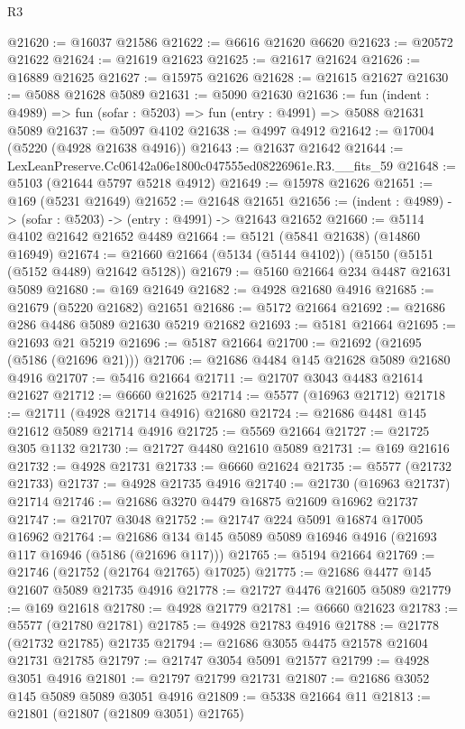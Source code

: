 \begin{lexlean}{R3}
\begin{coremodule}
@21620 := @16037 @21586
@21622 := @6616 @21620 @6620
@21623 := @20572 @21622
@21624 := @21619 @21623
@21625 := @21617 @21624
@21626 := @16889 @21625
@21627 := @15975 @21626
@21628 := @21615 @21627
@21630 := @5088 @21628 @5089
@21631 := @5090 @21630
@21636 := fun (indent : @4989) => fun (sofar : @5203) => fun (entry : @4991) => @5088 @21631 @5089
@21637 := @5097 @4102
@21638 := @4997 @4912
@21642 := @17004 (@5220 (@4928 @21638 @4916))
@21643 := @21637 @21642
@21644 := LexLeanPreserve.Cc06142a06e1800c047555ed08226961e.R3.__fits_59
@21648 := @5103 (@21644 @5797 @5218 @4912)
@21649 := @15978 @21626
@21651 := @169 (@5231 @21649)
@21652 := @21648 @21651
@21656 := (indent : @4989) -> (sofar : @5203) -> (entry : @4991) -> @21643 @21652
@21660 := @5114 @4102 @21642 @21652 @4489
@21664 := @5121 (@5841 @21638) (@14860 @16949)
@21674 := @21660 @21664 (@5134 (@5144 @4102)) (@5150 (@5151 (@5152 @4489) @21642 @5128))
@21679 := @5160 @21664 @234 @4487 @21631 @5089
@21680 := @169 @21649
@21682 := @4928 @21680 @4916
@21685 := @21679 (@5220 @21682) @21651
@21686 := @5172 @21664
@21692 := @21686 @286 @4486 @5089 @21630 @5219 @21682
@21693 := @5181 @21664
@21695 := @21693 @21 @5219
@21696 := @5187 @21664
@21700 := @21692 (@21695 (@5186 (@21696 @21)))
@21706 := @21686 @4484 @145 @21628 @5089 @21680 @4916
@21707 := @5416 @21664
@21711 := @21707 @3043 @4483 @21614 @21627
@21712 := @6660 @21625
@21714 := @5577 (@16963 @21712)
@21718 := @21711 (@4928 @21714 @4916) @21680
@21724 := @21686 @4481 @145 @21612 @5089 @21714 @4916
@21725 := @5569 @21664
@21727 := @21725 @305 @1132
@21730 := @21727 @4480 @21610 @5089
@21731 := @169 @21616
@21732 := @4928 @21731
@21733 := @6660 @21624
@21735 := @5577 (@21732 @21733)
@21737 := @4928 @21735 @4916
@21740 := @21730 (@16963 @21737) @21714
@21746 := @21686 @3270 @4479 @16875 @21609 @16962 @21737
@21747 := @21707 @3048
@21752 := @21747 @224 @5091 @16874 @17005 @16962
@21764 := @21686 @134 @145 @5089 @5089 @16946 @4916 (@21693 @117 @16946 (@5186 (@21696 @117)))
@21765 := @5194 @21664
@21769 := @21746 (@21752 (@21764 @21765) @17025)
@21775 := @21686 @4477 @145 @21607 @5089 @21735 @4916
@21778 := @21727 @4476 @21605 @5089
@21779 := @169 @21618
@21780 := @4928 @21779
@21781 := @6660 @21623
@21783 := @5577 (@21780 @21781)
@21785 := @4928 @21783 @4916
@21788 := @21778 (@21732 @21785) @21735
@21794 := @21686 @3055 @4475 @21578 @21604 @21731 @21785
@21797 := @21747 @3054 @5091 @21577
@21799 := @4928 @3051 @4916
@21801 := @21797 @21799 @21731
@21807 := @21686 @3052 @145 @5089 @5089 @3051 @4916
@21809 := @5338 @21664 @11
@21813 := @21801 (@21807 (@21809 @3051) @21765)

\end{coremodule}
\end{lexlean}
